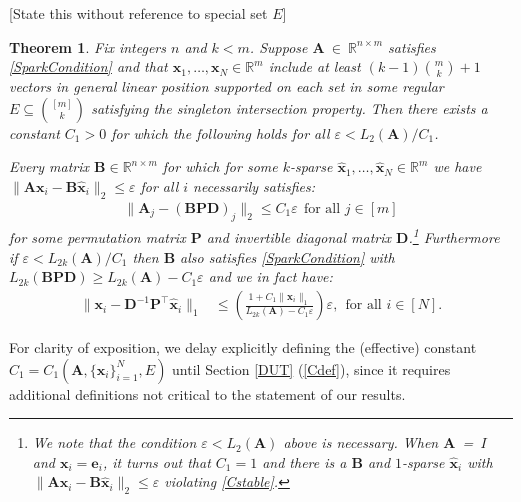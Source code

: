 \documentclass[9pt,twocolumn]{pnas-new}
\newtheorem{theorem}{Theorem}
\begin{document}
[State this without reference to special set $E$]
\begin{theorem}\label{DeterministicUniquenessTheorem}
Fix integers $n$ and $k < m$. Suppose $\mathbf{A}~\in~\mathbb{R}^{n \times m}$ satisfies \eqref{SparkCondition} and that \mbox{$\mathbf{x}_1, \ldots, \mathbf{x}_N \in \mathbb{R}^m$} include at least \mbox{$(k-1){m \choose k}+1$} vectors in general linear position supported on each set in some regular $E \subseteq {[m] \choose k}$ satisfying the singleton intersection property. Then there exists a constant $C_1 > 0$ for which the following holds for all $\varepsilon < L_2(\mathbf{A}) / C_1$. %

Every matrix $\mathbf{B} \in \mathbb{R}^{n \times m}$ for which for some $k$-sparse $\mathbf{\hat x}_1, \ldots, \mathbf{\hat x}_N \in \mathbb{R}^{m}$ we have \mbox{$\|\mathbf{A}\mathbf{x}_i - \mathbf{B}\mathbf{\hat x}_i\|_2 \leq \varepsilon$} for all $i$ necessarily satisfies:
\begin{align}\label{Cstable}
\|\mathbf{A}_j-(\mathbf{B}\mathbf{PD})_j\|_2 \leq C_1 \varepsilon \ \ \text{for all $j \in [m]$}
\end{align}
%
for some permutation matrix $\mathbf{P}$ and invertible diagonal matrix $\mathbf{D}$.\footnote{We note that the condition $\varepsilon < L_2(\mathbf{A})$ above is necessary. When \mbox{$\mathbf{A}$ = $I$} and $\mathbf{x}_i = \mathbf{e}_i$, it turns out that $C_1 = 1$ and there is a $\mathbf{B}$ and $1$-sparse $\mathbf{\hat x}_i$ with $\|\mathbf{A}\mathbf{x}_i - \mathbf{B}\mathbf{\hat x}_i\|_2 \leq \varepsilon$ violating \eqref{Cstable}.}
Furthermore if $\varepsilon < L_{2k}(\mathbf{A}) / C_1$ then $\mathbf{B}$ also satisfies \eqref{SparkCondition} with $L_{2k}(\mathbf{B}\mathbf{PD}) \geq L_{2k}(\mathbf{A}) - C_1 \varepsilon$ and we in fact have:
\begin{align}\label{b-PDa}
\|\mathbf{x}_i - \mathbf{D}^{-1}\mathbf{P}^{\top}\mathbf{\hat x}_i\|_1 &\leq  \left( \frac{ 1+C_1 \|\mathbf{x}_i\|_1 }{ L_{2k}(\mathbf{A}) -  C_1\varepsilon } \right) \varepsilon,
 \ \ \text{for all $i \in [N]$}.
\end{align}
\end{theorem}

For clarity of exposition, we delay explicitly defining the (effective) constant $C_1 = C_1(\mathbf{A}, \{\mathbf{x}_i\}_{i=1}^N, E)$ until Section \ref{DUT} (\eqref{Cdef}), since it requires additional definitions not critical to the statement of our results.
\end{document}
